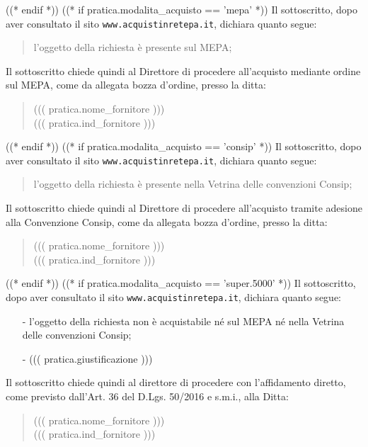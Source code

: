 \documentclass[a4paper,12pt]{letter}
\begin{document}
((* endif *))
((* if pratica.modalita_acquisto == 'mepa' *))
Il sottoscritto, dopo aver consultato il sito {\tt www.acquistinretepa.it},
dichiara quanto segue:
\begin{quote}
l'oggetto della richiesta \`e presente sul MEPA;
\end{quote}

Il sottoscritto chiede quindi al Direttore di procedere all'acquisto mediante ordine sul MEPA,
come da allegata bozza d'ordine, presso la ditta:
\begin{quote}
((( pratica.nome_fornitore )))\\
((( pratica.ind_fornitore )))
\end{quote}
((* endif *))
((* if pratica.modalita_acquisto == 'consip' *))
Il sottoscritto, dopo aver consultato il sito {\tt www.acquistinretepa.it},
dichiara quanto segue:
\begin{quote}
l'oggetto della richiesta \`e presente nella Vetrina delle convenzioni Consip;
\end{quote}

Il sottoscritto chiede quindi al Direttore di procedere all'acquisto
tramite adesione alla Convenzione Consip, come da allegata bozza d'ordine,
presso la ditta:
\begin{quote}
((( pratica.nome_fornitore )))\\
((( pratica.ind_fornitore )))
\end{quote}
((* endif *))
((* if pratica.modalita_acquisto == 'super.5000' *))
Il sottoscritto, dopo aver consultato il sito {\tt www.acquistinretepa.it},
dichiara quanto segue:

\begin{itemize}
\item[-] l'oggetto della richiesta non \`e acquistabile n\'e sul MEPA n\'e
	 nella Vetrina delle convenzioni Consip;
\item[-] ((( pratica.giustificazione )))
\end{itemize}
Il sottoscritto chiede quindi al direttore di procedere con l'affidamento diretto,
come previsto dall'Art. 36 del D.Lgs. 50/2016 e s.m.i., alla Ditta: 
\begin{quote}
((( pratica.nome_fornitore )))\\
((( pratica.ind_fornitore )))
\end{quote}
\end{document}
